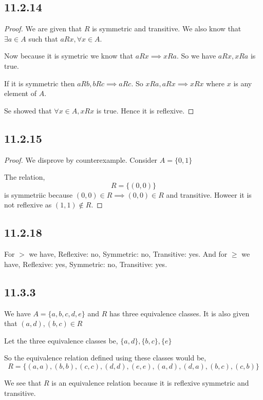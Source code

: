\documentclass[a4paper]{report}
\begin{document}
\subsection*{11.2.14}

\begin{proof}
We are given that $R$ is symmetric and transitive. We also know that $\exists a \in A$ such that $aRx, \forall x \in A$.

Now because it is symetric we know that $aRx \implies xRa$. So we have $aRx, xRa$ is true.

If it is symmetric then $aRb, bRc \implies aRc$. So $xRa, aRx \implies xRx$  where $x$ is any element of $A$.

Se showed that $\forall x \in A, xRx$ is true. Hence it is reflexive.

\end{proof}
\subsection*{11.2.15}
\begin{proof}
    We disprove by counterexample. Consider $A = \{0,1\}$

    The relation,  
    $$ R = \{(0,0)\} $$ is symmetriic because $(0,0) \in R \implies (0,0) \in R$ and transitive. Howeer it is not reflexive as $(1,1) \not \in R$.
\end{proof}


\subsection*{11.2.18}
For $>$ we have, Reflexive: no, Symmetric: no, Transitive: yes. And for $\ge$ we have, Reflexive: yes, Symmetric: no, Transitive: yes.



\subsection*{11.3.3}

We have $A = \{a,b,c,d,e\}$ and  $R$ has three equivalence classes. It is also given that $(a,d),(b,c) \in R$

Let the three equivalence classes be, $\{a,d\}, \{b,c\}, \{e\}$ 

So the equivalence relation defined using these classes would be, 
$$ R = \{(a,a), (b,b), (c,c), (d,d), (e,e), (a,d), (d,a), (b,c), (c,b)\} $$ 

We see that $R$ is an equivalence relation because it is reflexive symmetric and transitive.
\end{document}
